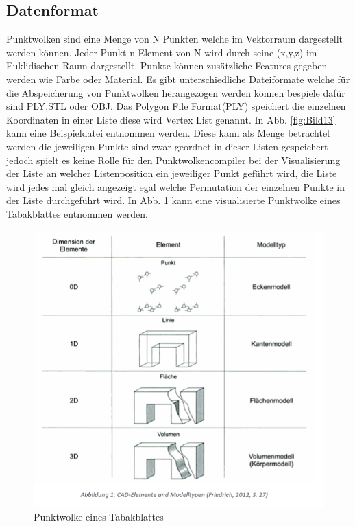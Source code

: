 \documentclass{llncs}
\begin{document}
\subsection{Datenformat}

Punktwolken sind eine Menge von N Punkten welche im Vektorraum dargestellt werden können. Jeder Punkt n Element von N wird durch seine (x,y,z) im Euklidischen Raum dargestellt. Punkte können zusätzliche Features gegeben werden wie Farbe oder Material. Es gibt unterschiedliche Dateiformate welche für die Abspeicherung von Punktwolken herangezogen werden können bespiele dafür sind PLY,STL oder OBJ. Das Polygon File Format(PLY) speichert die einzelnen Koordinaten in einer Liste diese wird Vertex List genannt. In Abb. \ref{fig:Bild13} kann eine Beispieldatei entnommen werden. Diese kann als Menge betrachtet werden die jeweiligen Punkte sind zwar geordnet in dieser Listen gespeichert jedoch spielt es keine Rolle für den Punktwolkencompiler bei der Visualisierung der Liste an welcher Listenposition ein jeweiliger Punkt geführt wird, die Liste wird jedes mal gleich angezeigt egal welche Permutation der einzelnen Punkte in der Liste durchgeführt wird. In Abb. \ref{fig:Bild12} kann eine visualisierte Punktwolke eines Tabakblattes entnommen werden. 

\begin{figure}[htbp] 
	\centering
	\includegraphics[width=1.0\textwidth]{datenformat.png}
	\caption{Punktwolke eines Tabakblattes}
	\label{fig:Bild12}
\end{figure}
\end{document}
